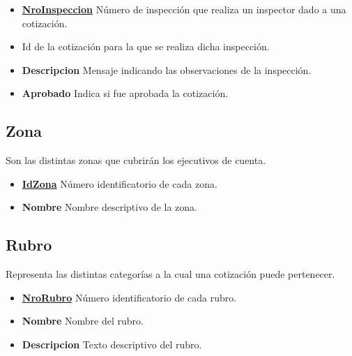 \documentclass[a4paper,11pt]{article}
\begin{document}
\begin{itemize}
   
  \item \textbf{\uline{NroInspeccion}} Número de inspección que realiza un inspector dado a una cotización.
  
  \item \textbf{} Id de la cotización para la que se realiza dicha inspección.
    
  \item \textbf{Descripcion} Mensaje indicando las observaciones de la inspección.

  \item \textbf{Aprobado} Indica si fue aprobada la cotización.
    
\end{itemize}

\subsection{Zona}

Son las distintas zonas que cubrirán los ejecutivos de cuenta.

\begin{itemize}
   
  \item \textbf{\uline{IdZona}} Número identificatorio de cada zona.
  
  \item \textbf{Nombre} Nombre descriptivo de la zona.
  
\end{itemize}

\subsection{Rubro}

Representa las distintas categorías a la cual una cotización puede pertenecer.

\begin{itemize}
   
  \item \textbf{\uline{NroRubro}} Número identificatorio de cada rubro.
  
  \item \textbf{Nombre} Nombre del rubro.

  \item \textbf{Descripcion} Texto descriptivo del rubro.
  
\end{itemize}
\end{document}
